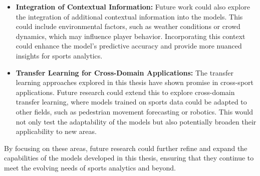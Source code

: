 \begin{itemize}
    \item \textbf{Integration of Contextual Information:} Future work could also explore the integration of additional contextual information into the models. This could include environmental factors, such as weather conditions or crowd dynamics, which may influence player behavior. Incorporating this context could enhance the model's predictive accuracy and provide more nuanced insights for sports analytics.

    \item \textbf{Transfer Learning for Cross-Domain Applications:} The transfer learning approaches explored in this thesis have shown promise in cross-sport applications. Future research could extend this to explore cross-domain transfer learning, where models trained on sports data could be adapted to other fields, such as pedestrian movement forecasting or robotics. This would not only test the adaptability of the models but also potentially broaden their applicability to new areas.
\end{itemize}

By focusing on these areas, future research could further refine and expand the capabilities of the models developed in this thesis, ensuring that they continue to meet the evolving needs of sports analytics and beyond.
